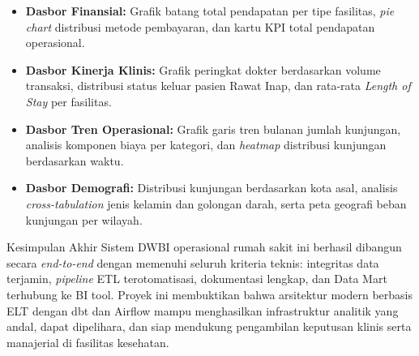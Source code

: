 \begin{itemize}
  \item \textbf{Dasbor Finansial:} Grafik batang total pendapatan per tipe fasilitas, \textit{pie chart} distribusi metode pembayaran, dan kartu KPI total pendapatan operasional.
  \item \textbf{Dasbor Kinerja Klinis:} Grafik peringkat dokter berdasarkan volume transaksi, distribusi status keluar pasien Rawat Inap, dan rata-rata \textit{Length of Stay} per fasilitas.
  \item \textbf{Dasbor Tren Operasional:} Grafik garis tren bulanan jumlah kunjungan, analisis komponen biaya per kategori, dan \textit{heatmap} distribusi kunjungan berdasarkan waktu.
  \item \textbf{Dasbor Demografi:} Distribusi kunjungan berdasarkan kota asal, analisis \textit{cross-tabulation} jenis kelamin dan golongan darah, serta peta geografi beban kunjungan per wilayah.
\end{itemize}
 
\begin{mybox}{Kesimpulan Akhir}
Sistem DWBI operasional rumah sakit ini berhasil dibangun secara \textit{end-to-end} dengan memenuhi seluruh kriteria teknis: integritas data terjamin, \textit{pipeline} ETL terotomatisasi, dokumentasi lengkap, dan Data Mart terhubung ke BI tool. Proyek ini membuktikan bahwa arsitektur modern berbasis ELT dengan dbt dan Airflow mampu menghasilkan infrastruktur analitik yang andal, dapat dipelihara, dan siap mendukung pengambilan keputusan klinis serta manajerial di fasilitas kesehatan.
\end{mybox}
